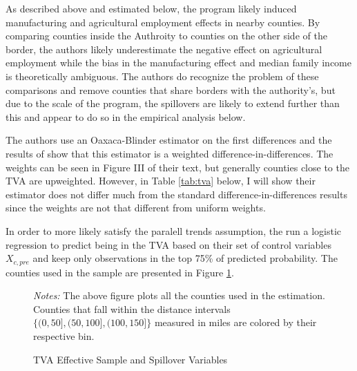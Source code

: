 \documentclass[11pt]{article}
\begin{document}
As described above and estimated below, the program likely induced manufacturing and agricultural employment effects in nearby counties. By comparing counties inside the Authroity to counties on the other side of the border, the authors likely underestimate the negative effect on agricultural employment while the bias in the manufacturing effect and median family income is theoretically ambiguous. The authors do recognize the problem of these comparisons and remove counties that share borders with the authority's, but due to the scale of the program, the spillovers are likely to extend further than this and appear to do so in the empirical analysis below.  

The authors use an Oaxaca-Blinder estimator on the first differences and the results of \citet{Kline_2011} show that this estimator is a weighted difference-in-differences. The weights can be seen in Figure III of their text, but generally counties close to the TVA are upweighted. However, in Table \ref{tab:tva} below, I will show their estimator does not differ much from the standard difference-in-differences results since the weights are not that different from uniform weights. 

In order to more likely satisfy the paralell trends assumption, the run a logistic regression to predict being in the TVA based on their set of control variables $X_{c, pre}$ and keep only observations in the top 75\% of predicted probability. The counties used in the sample are presented in Figure \ref{fig:tva_sample}. 

\begin{figure}[tb!]
    \caption{TVA Effective Sample and Spillover Variables}
    \label{fig:tva_sample}

    {\centering
    }

    {\footnotesize \textit{Notes:} The above figure plots all the counties used in the estimation. Counties that fall within the distance intervals $\{(0, 50], (50, 100], (100, 150]\}$ measured in miles are colored by their respective bin.}
\end{figure}
\end{document}
